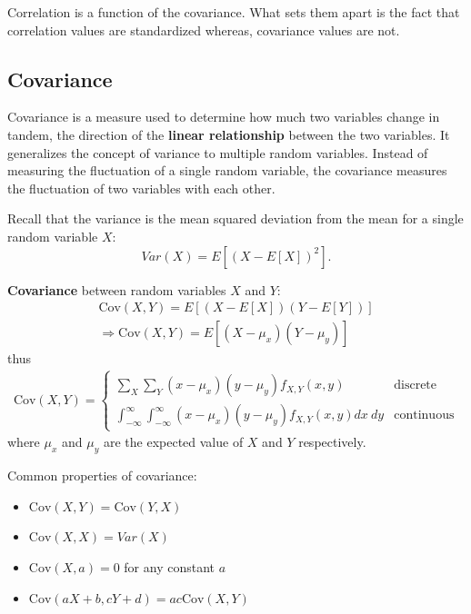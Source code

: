 \documentclass[10pt,a4paper]{article}
\begin{document}
Correlation is a function of the covariance. What sets them apart is the fact that correlation values are standardized whereas, covariance values are not. 

\subsection{Covariance}

Covariance is a measure used to determine how much two variables change in tandem, the direction of
the \textbf{linear relationship} between the two variables. It generalizes the concept of variance to
multiple random variables. Instead of measuring the fluctuation of a single random variable, the
covariance measures the
fluctuation of two variables with each other.

Recall that the variance is the mean squared deviation from the mean for a single random variable
$X$:
$$
Var(X)=E[(X-E[X])^2].
$$

\begin{tcolorbox}[breakable,colback=white]
   \textbf{Covariance} between random variables $X$ and $Y$: 
   \begin{align*}
        \text{Cov}(X,Y )= E[(X-E[X])(Y-E[Y])] \\
        \Rightarrow \text{Cov}(X, Y ) = E[(X - \mu_x)(Y - \mu_y)]
   \end{align*}
   thus 
   \begin{align*}
        \text{Cov}(X, Y ) = 
        \begin{cases}
            \sum_X \sum_Y (x - \mu_x)(y - \mu_y)f_{X,Y}(x,y) & \text{discrete} \\
            \int_{-\infty}^{\infty} \int_{-\infty}^{\infty} (x-\mu_x)(y-\mu_y) f_{X,Y}(x,y) dx\: dy & \text{continuous}
        \end{cases}
   \end{align*}
   where $\mu_x$ and $\mu_y$ are the expected value of $X$ and $Y$ respectively.
\end{tcolorbox}

Common properties of covariance:
\begin{itemize}
    \item $\text{Cov}(X, Y ) = \text{Cov}(Y, X)$
    \item $\text{Cov}(X, X) = Var(X)$
    \item $\text{Cov}(X, a) = 0$ for any constant $a$
    \item $\text{Cov}(aX + b, cY + d) = ac \text{Cov}(X, Y )$
\end{itemize}
\end{document}
